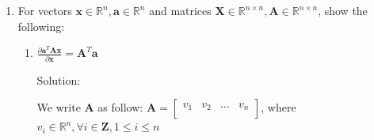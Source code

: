 \documentclass[12pt]{article}
\newcommand{\solu}{{\color{blue} Solution:}}
\newcommand{\Rbb}{\mathbb{R}}
\newcommand{\Z}{\mathbf{Z}}
\begin{document}
\begin{enumerate}
\begin{enumerate}
                    \solu 
                    \begin{proof}
                        Let $\pmb{A} = \begin{bmatrix}
                            a_{11} & a_{12} & \dots & a_{1n}\\
                            a_{21} & a_{22} & \dots & a_{2n}\\
                            \vdots & \ddots &  & \vdots\\
                            a_{11} & a_{12} & \dots & a_{1n}
                        \end{bmatrix}$\\
                        Then $\alpha\pmb{A} = \begin{bmatrix}
                            \alpha a_{11} & \alpha a_{12} & \dots & \alpha a_{1n}\\
                            \alpha a_{21} & \alpha a_{22} & \dots & \alpha a_{2n}\\
                            \vdots & \ddots &  & \vdots\\
                            \alpha a_{11} & \alpha a_{12} & \dots & \alpha a_{nn}
                        \end{bmatrix}$\\
                        Then, trace($\alpha\pmb{A}$) = $\alpha a_{11} + \alpha a_{22} + \dots \alpha a_{nn} = \sum_{i = 1}^n \alpha a_{ii} = \alpha\sum_{i = 1}^n  a_{ii}$\\
                        On the other hand, $\alpha$ trace($\pmb{A}$) = $\alpha \cdot (a_{11} + a_{22} + \dots a_{nn}) = \alpha\sum_{i = 1}^n  a_{ii}$

                        Therefore, trace($\alpha \pmb{A}) = \alpha$ trace($\pmb{A}$)
                    \end{proof}
                    
                    
          \end{enumerate}
          \item For vectors $\pmb{x} \in \Rbb^n, \pmb{a} \in \Rbb^n$ and matrices $\pmb{X}\in \Rbb^{n \times n}, \pmb{A} \in \Rbb^{n \times n}$, show the following:
          \begin{enumerate}
            \item $\frac{\partial \pmb{a}^T\pmb{Ax}}{\partial \pmb{x}} = \pmb{A}^T\pmb{a}$
            
            \solu 

            We write $\pmb{A}$ as follow: 
            $\pmb{A} = \begin{bmatrix}
                v_1 & v_2 & \dots & v_n \\
            \end{bmatrix}$, where $v_i \in \Rbb^n, \forall i \in \Z, 1\le i \le n$


\end{enumerate}
\end{enumerate}
\end{document}
